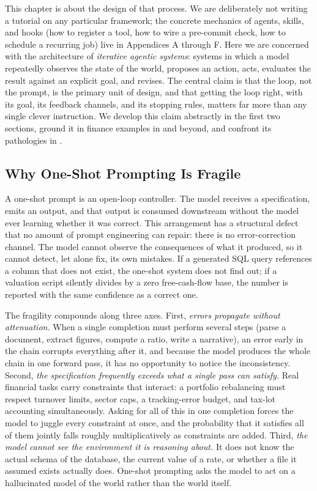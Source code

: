 This chapter is about the design of that process. We are deliberately not writing a tutorial on any particular framework; the concrete mechanics of agents, skills, and hooks (how to register a tool, how to wire a pre-commit check, how to schedule a recurring job) live in Appendices A through F. Here we are concerned with the architecture of \emph{iterative agentic systems}: systems in which a model repeatedly observes the state of the world, proposes an action, acts, evaluates the result against an explicit goal, and revises. The central claim is that the loop, not the prompt, is the primary unit of design, and that getting the loop right, with its goal, its feedback channels, and its stopping rules, matters far more than any single clever instruction. We develop this claim abstractly in the first two sections, ground it in finance examples in  and beyond, and confront its pathologies in .

\subsection{Why One-Shot Prompting Is Fragile}\label{subsec:one-shot-fragile}

A one-shot prompt is an open-loop controller. The model receives a specification, emits an output, and that output is consumed downstream without the model ever learning whether it was correct. This arrangement has a structural defect that no amount of prompt engineering can repair: there is no error-correction channel. The model cannot observe the consequences of what it produced, so it cannot detect, let alone fix, its own mistakes. If a generated SQL query references a column that does not exist, the one-shot system does not find out; if a valuation script silently divides by a zero free-cash-flow base, the number is reported with the same confidence as a correct one.

The fragility compounds along three axes. First, \emph{errors propagate without attenuation.} When a single completion must perform several steps (parse a document, extract figures, compute a ratio, write a narrative), an error early in the chain corrupts everything after it, and because the model produces the whole chain in one forward pass, it has no opportunity to notice the inconsistency. Second, \emph{the specification frequently exceeds what a single pass can satisfy.} Real financial tasks carry constraints that interact: a portfolio rebalancing must respect turnover limits, sector caps, a tracking-error budget, and tax-lot accounting simultaneously. Asking for all of this in one completion forces the model to juggle every constraint at once, and the probability that it satisfies all of them jointly falls roughly multiplicatively as constraints are added. Third, \emph{the model cannot see the environment it is reasoning about.} It does not know the actual schema of the database, the current value of a rate, or whether a file it assumed exists actually does. One-shot prompting asks the model to act on a hallucinated model of the world rather than the world itself.

